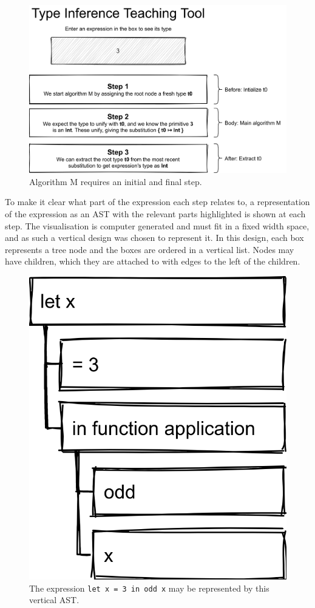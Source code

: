 \documentclass[a4paper,fleqn,oneside,12pt]{report}
\begin{document}
{\centering \begin{figure}[h!]
  \centering
  \includegraphics[width=0.960\linewidth]{images/image10.png}
  \caption{Algorithm M requires an initial and final step.}
\end{figure} \par}

To make it clear what part of the expression each step relates to, a representation of the expression as an AST with the relevant parts highlighted is shown at each step. The visualisation is computer generated and must fit in a fixed width space, and as such a vertical design was chosen to represent it. In this design, each box represents a tree node and the boxes are ordered in a vertical list. Nodes may have children, which they are attached to with edges to the left of the children.

{\centering \begin{figure}[h!]
  \centering
  \includegraphics[width=0.357\linewidth]{images/image31.png}
  \caption{The expression \texttt{let x = 3 in odd x} may be represented by this vertical AST.}
\end{figure} \par}
\end{document}
